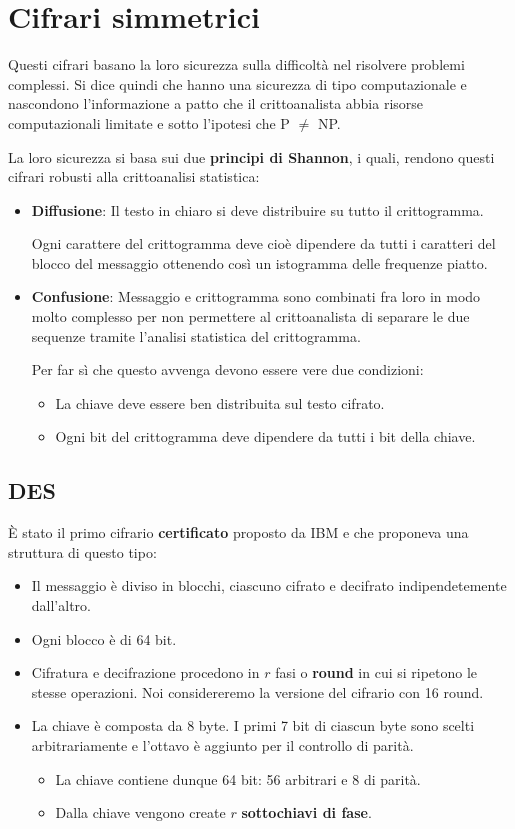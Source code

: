 \chapter{Cifrari simmetrici}\label{critto_sim_massa}
Questi cifrari basano la loro sicurezza sulla difficolt\`a nel risolvere problemi complessi. Si dice quindi che hanno
una sicurezza di tipo computazionale e nascondono l'informazione a patto che il crittoanalista abbia risorse
computazionali limitate e sotto l'ipotesi che P $\neq$ NP.

La loro sicurezza si basa sui due \textbf{principi di Shannon}, i quali, rendono questi cifrari robusti alla
crittoanalisi statistica:
\begin{itemize}
	\item \textbf{Diffusione}: Il testo in chiaro si deve distribuire su tutto il crittogramma.

	      Ogni carattere del crittogramma deve cio\`e dipendere da tutti i caratteri del blocco del messaggio ottenendo
	      cos\`i un istogramma delle frequenze piatto.
	\item \textbf{Confusione}: Messaggio e crittogramma sono combinati fra loro in modo molto complesso per non
	      permettere al crittoanalista di separare le due sequenze tramite l'analisi statistica del crittogramma.

	      Per far s\`i che questo avvenga devono essere vere due condizioni:
	      \begin{itemize}
		      \item La chiave deve essere ben distribuita sul testo cifrato.
		      \item Ogni bit del crittogramma deve dipendere da tutti i bit della chiave.
	      \end{itemize}
\end{itemize}

\section{DES}\label{DES}
\`E stato il primo cifrario \textbf{certificato} proposto da IBM e che proponeva una struttura di questo tipo:
\begin{itemize}
	\item Il messaggio \`e diviso in blocchi, ciascuno cifrato e decifrato indipendetemente dall'altro.
	\item Ogni blocco \`e di 64 bit.
	\item Cifratura e decifrazione procedono in $r$ fasi o \textbf{round} in cui si ripetono le stesse operazioni. Noi
	      considereremo la versione del cifrario con 16 round.
	\item La chiave \`e composta da 8 byte. I primi 7 bit di ciascun byte sono scelti arbitrariamente e l'ottavo \`e
	      aggiunto per il controllo di parit\`a.
	      \begin{itemize}
		      \item La chiave contiene dunque 64 bit: 56 arbitrari e 8 di parit\`a.
		      \item Dalla chiave vengono create $r$ \textbf{sottochiavi di fase}.
	      \end{itemize}
\end{itemize}


